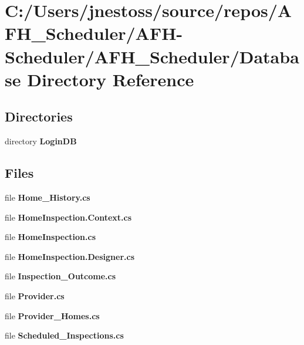 \section{C\+:/\+Users/jnestoss/source/repos/\+A\+F\+H\+\_\+\+Scheduler/\+A\+F\+H-\/\+Scheduler/\+A\+F\+H\+\_\+\+Scheduler/\+Database Directory Reference}
\label{dir_83d8905afcf89478106b950861166c92}
\subsection*{Directories}
\begin{DoxyCompactItemize}
\item 
directory \textbf{ Login\+DB}
\end{DoxyCompactItemize}
\subsection*{Files}
\begin{DoxyCompactItemize}
\item 
file \textbf{ Home\+\_\+\+History.\+cs}
\item 
file \textbf{ Home\+Inspection.\+Context.\+cs}
\item 
file \textbf{ Home\+Inspection.\+cs}
\item 
file \textbf{ Home\+Inspection.\+Designer.\+cs}
\item 
file \textbf{ Inspection\+\_\+\+Outcome.\+cs}
\item 
file \textbf{ Provider.\+cs}
\item 
file \textbf{ Provider\+\_\+\+Homes.\+cs}
\item 
file \textbf{ Scheduled\+\_\+\+Inspections.\+cs}
\end{DoxyCompactItemize}
